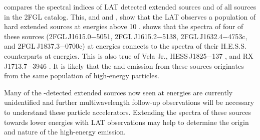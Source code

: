  compares the spectral indices of LAT
detected extended sources and of all sources in the 2FGL catalog. This, and
 and ,
show that the LAT observes a population of hard extended sources
at energies above 10 \gev.   shows that
the spectra of four of these sources (2FGL\,J1615.0$-$5051,
2FGL\,J1615.2$-$5138, 2FGL\,J1632.4$-$4753c, and 2FGL\,J1837.3$-$0700c)
at \gev energies connects to the spectra of their H.E.S.S. counterparts
at \tev energies. This is also true of Vela Jr., HESS\,J1825$-$137
\citep{grondin_2011_detection-pulsar}, and RX\,J1713.7$-$3946 \citep{abdo_2011a_observations-young}.
It is likely that the \gev and \tev emission from these sources originates
from the same population of high-energy particles.

Many of the \tev-detected extended sources now seen at \gev energies
are currently unidentified and further multiwavelength follow-up
observations will be necessary to understand these particle accelerators.
Extending the spectra of these \tev sources towards lower energies
with LAT observations may help to determine the origin and nature of
the high-energy emission.




